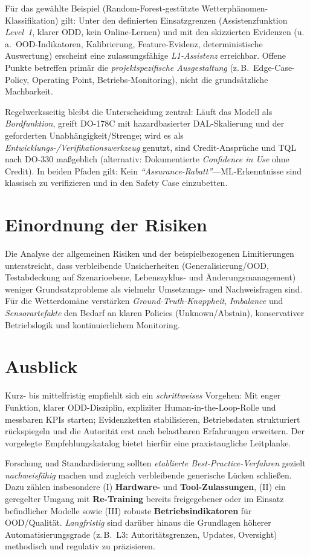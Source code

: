 Für das gewählte Beispiel (Random-Forest-gestützte Wetterphänomen-Klassifikation) gilt: Unter den definierten Einsatzgrenzen 
(Assistenzfunktion \textit{Level~1}, klarer ODD, kein Online-Lernen) und mit den skizzierten Evidenzen 
(u.\,a.\ OOD-Indikatoren, Kalibrierung, Feature-Evidenz, deterministische Auswertung) erscheint eine 
zulassungsfähige \emph{L1-Assistenz} erreichbar. Offene Punkte betreffen primär die 
\emph{projektspezifische Ausgestaltung} (z.\,B.\ Edge-Case-Policy, Operating Point, Betriebs-Monitoring), 
nicht die grundsätzliche Machbarkeit.
\medskip

Regelwerksseitig bleibt die Unterscheidung zentral: Läuft das Modell als \emph{Bordfunktion}, greift DO-178C mit 
hazardbasierter DAL-Skalierung und der geforderten Unabhängigkeit/Strenge; wird es als \emph{Entwicklungs-/Verifikationswerkzeug} 
genutzt, sind Credit-Ansprüche und TQL nach DO-330 maßgeblich (alternativ: Dokumentierte \emph{Confidence in Use} ohne Credit). 
In beiden Pfaden gilt: Kein \emph{``Assurance-Rabatt''}—ML-Erkenntnisse sind klassisch zu verifizieren und in den Safety Case einzubetten.


\section{Einordnung der Risiken}
Die Analyse der allgemeinen Risiken und der beispielbezogenen Limitierungen unterstreicht, dass verbleibende 
Unsicherheiten (Generalisierung/OOD, Testabdeckung auf Szenarioebene, Lebenszyklus- und Änderungsmanagement) 
weniger Grundsatzprobleme als vielmehr Umsetzungs- und Nachweisfragen sind. Für die Wetterdomäne verstärken 
\emph{Ground-Truth-Knappheit}, \emph{Imbalance} und \emph{Sensorartefakte} den Bedarf an klaren Policies 
(Unknown/Abstain), konservativer Betriebslogik und kontinuierlichem Monitoring. 


\section{Ausblick}
Kurz- bis mittelfristig empfiehlt sich ein \emph{schrittweises} Vorgehen: Mit enger Funktion, klarer ODD-Disziplin, 
expliziter Human-in-the-Loop-Rolle und messbaren KPIs starten; Evidenzketten stabilisieren, Betriebsdaten strukturiert 
rückspiegeln und die Autorität erst nach belastbaren Erfahrungen erweitern. Der vorgelegte Empfehlungskatalog bietet 
hierfür eine praxistaugliche Leitplanke.
\medskip

Forschung und Standardisierung sollten \emph{etablierte Best-Practice-Verfahren} gezielt
\emph{nachweisfähig} machen und zugleich verbleibende generische Lücken schließen. Dazu zählen
insbesondere (I) \textbf{Hardware-} und \textbf{Tool-Zulassungen}, (II) ein geregelter Umgang mit 
\textbf{Re-Training} bereits freigegebener oder im Einsatz befindlicher Modelle sowie (III) robuste
\textbf{Betriebsindikatoren} für OOD/Qualität. \emph{Langfristig} sind darüber hinaus die
Grundlagen höherer Automatisierungsgrade (z.\,B.\ L3: Autoritätsgrenzen, Updates, Oversight)
methodisch und regulativ zu präzisieren. 

